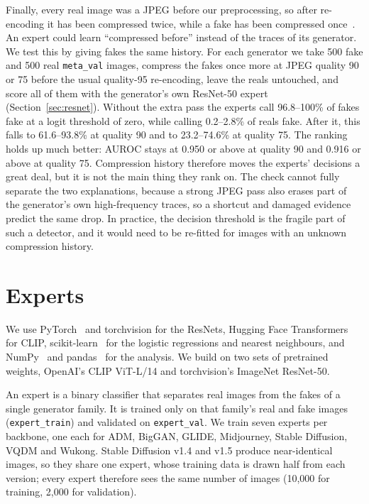 \documentclass[10pt,a4paper]{article}
\begin{document}
Finally, every real image was a JPEG before our preprocessing, so after re-encoding it has been compressed twice, while a fake has been compressed once~\cite{grommelt2024fake}. An expert could learn ``compressed before'' instead of the traces of its generator. We test this by giving fakes the same history. For each generator we take 500 fake and 500 real \texttt{meta\_val} images, compress the fakes once more at JPEG quality 90 or 75 before the usual quality-95 re-encoding, leave the reals untouched, and score all of them with the generator's own ResNet-50 expert (Section~\ref{sec:resnet}). Without the extra pass the experts call 96.8--100\% of fakes fake at a logit threshold of zero, while calling 0.2--2.8\% of reals fake. After it, this falls to 61.6--93.8\% at quality 90 and to 23.2--74.6\% at quality 75. The ranking holds up much better: AUROC stays at 0.950 or above at quality 90 and 0.916 or above at quality 75. Compression history therefore moves the experts' decisions a great deal, but it is not the main thing they rank on. The check cannot fully separate the two explanations, because a strong JPEG pass also erases part of the generator's own high-frequency traces, so a shortcut and damaged evidence predict the same drop. In practice, the decision threshold is the fragile part of such a detector, and it would need to be re-fitted for images with an unknown compression history.

\section{Experts}\label{sec:experts}

We use PyTorch~\cite{paszke2019pytorch} and torchvision for the ResNets, Hugging Face Transformers~\cite{wolf2020transformers} for CLIP, scikit-learn~\cite{pedregosa2011sklearn} for the logistic regressions and nearest neighbours, and NumPy~\cite{harris2020numpy} and pandas~\cite{mckinney2010pandas} for the analysis. We build on two sets of pretrained weights, OpenAI's CLIP ViT-L/14 and torchvision's ImageNet ResNet-50.

An expert is a binary classifier that separates real images from the fakes of a single generator family. It is trained only on that family's real and fake images (\texttt{expert\_train}) and validated on \texttt{expert\_val}. We train seven experts per backbone, one each for ADM, BigGAN, GLIDE, Midjourney, Stable Diffusion, VQDM and Wukong. Stable Diffusion v1.4 and v1.5 produce near-identical images, so they share one expert, whose training data is drawn half from each version; every expert therefore sees the same number of images (10,000 for training, 2,000 for validation).
\end{document}

